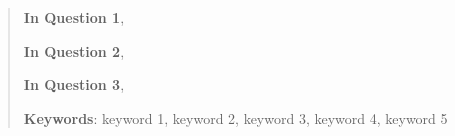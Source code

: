 \begin{abstract}%


	\lipsum[2]	
	
	
	\textbf{In Question 1}, \lipsum[1]	
	
	
	
	
	\textbf{In Question 2},
	
	
	
	\textbf{In Question 3},
	
	
	
	
	
	
	
	
	\vspace{5pt}  %
	\noindent\textbf{Keywords}: keyword 1,  keyword 2,  keyword 3,  keyword 4,  keyword 5
\end{abstract}
\maketitle  %

\tableofcontents  %